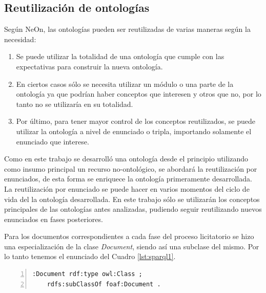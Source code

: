     \subsection{Reutilización de ontologías}

    Según NeOn, las ontologías pueden ser reutilizadas de varias maneras según la necesidad:
    
    \begin{enumerate}
       \item Se puede utilizar la totalidad de una ontología que cumple con las expectativas para construir la nueva ontología.
        \item  En ciertos casos sólo se necesita utilizar un módulo o una parte de la ontología ya que podrían haber conceptos que interesen y otros que no, por lo tanto no se utilizaría en su totalidad.
        \item  Por último, para tener mayor control de los conceptos reutilizados, se puede utilizar la ontología a nivel de enunciado o tripla, importando solamente el enunciado que interese. 
    \end{enumerate}
       
   


Como en este trabajo se desarrolló una ontología desde el principio utilizando como insumo principal un recurso no-ontológico, se abordará la reutilización por enunciados, de esta forma se enriquece la ontología primeramente desarrollada. La reutilización por enunciado se puede hacer en varios momentos del ciclo de vida del la ontología desarrollada. En este trabajo sólo se utilizarán los conceptos principales de las ontologías antes analizadas, pudiendo seguir reutilizando nuevos enunciados en fases posteriores.

Para los documentos correspondientes a cada fase del proceso licitatorio se hizo una especialización de la clase \textit{Document}, siendo así una subclase del mismo. Por lo tanto tenemos el enunciado del Cuadro \ref{lst:sparql1}.\hfill \break


\noindent\begin{minipage}{\textwidth}

\begin{lstlisting}[captionpos=b, caption={Reutilización de la Clase \textit{Document}}, label={lst:sparql1},  numbers=left,  numberstyle=\tiny\color{mygray},frame=single]
:Document rdf:type owl:Class ;
    rdfs:subClassOf foaf:Document .
\end{lstlisting}
\end{minipage}

